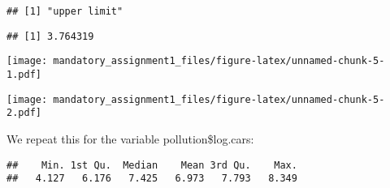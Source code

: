 \documentclass[
]{article}
\newenvironment{Shaded}{\begin{snugshade}}{\end{snugshade}}
\newcommand{\AttributeTok}[1]{\textcolor[rgb]{0.77,0.63,0.00}{#1}}
\newcommand{\CommentTok}[1]{\textcolor[rgb]{0.56,0.35,0.01}{\textit{#1}}}
\newcommand{\DecValTok}[1]{\textcolor[rgb]{0.00,0.00,0.81}{#1}}
\newcommand{\FloatTok}[1]{\textcolor[rgb]{0.00,0.00,0.81}{#1}}
\newcommand{\FunctionTok}[1]{\textcolor[rgb]{0.00,0.00,0.00}{#1}}
\newcommand{\NormalTok}[1]{#1}
\newcommand{\SpecialCharTok}[1]{\textcolor[rgb]{0.00,0.00,0.00}{#1}}
\newcommand{\StringTok}[1]{\textcolor[rgb]{0.31,0.60,0.02}{#1}}
\begin{document}
\begin{verbatim}
## [1] "upper limit"
\end{verbatim}

\begin{Shaded}
\end{Shaded}

\begin{verbatim}
## [1] 3.764319
\end{verbatim}

\begin{Shaded}
\end{Shaded}

\texttt{[image: mandatory\_assignment1\_files/figure-latex/unnamed-chunk-5-1.pdf]}

\begin{Shaded}
\end{Shaded}

\texttt{[image: mandatory\_assignment1\_files/figure-latex/unnamed-chunk-5-2.pdf]}

We repeat this for the variable pollution\$log.cars:

\begin{Shaded}
\end{Shaded}

\begin{verbatim}
##    Min. 1st Qu.  Median    Mean 3rd Qu.    Max. 
##   4.127   6.176   7.425   6.973   7.793   8.349
\end{verbatim}
\end{document}
